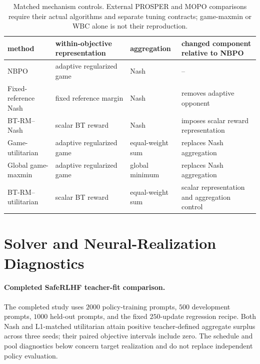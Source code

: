 \documentclass{article}
\theoremstyle{remark}
\theoremstyle{plain}
\newcommand{\NBPO}{\textsc{NBPO}}
\begin{document}
\begin{table}[t]
\centering\scriptsize
\setlength{\tabcolsep}{2.8pt}
\caption{Matched mechanism controls. External PROSPER and MOPO comparisons require their actual algorithms and separate tuning contracts; game-maxmin or WBC alone is not their reproduction.}
\label{tab:baseline-contract}
\begin{tabular}{llll}
\toprule
method & within-objective representation & aggregation & changed component relative to \NBPO{}\\
\midrule
\NBPO{} & adaptive regularized game & Nash & --\\
Fixed-reference Nash & fixed reference margin & Nash & removes adaptive opponent\\
BT-RM--Nash & scalar BT reward & Nash & imposes scalar reward representation\\
Game-utilitarian & adaptive regularized game & equal-weight sum & replaces Nash aggregation\\
Global game-maxmin & adaptive regularized game & global minimum & replaces Nash aggregation\\
BT-RM--utilitarian & scalar BT reward & equal-weight sum & scalar representation and aggregation control\\
\bottomrule
\end{tabular}
\end{table}

\section{Solver and Neural-Realization Diagnostics}
\label{app:solver-neural}

\paragraph{Completed SafeRLHF teacher-fit comparison.}
The completed study uses $2000$ policy-training prompts, $500$ development prompts, $1000$ held-out prompts, and the fixed $250$-update regression recipe. Both Nash and L1-matched utilitarian attain positive teacher-defined aggregate surplus across three seeds; their paired objective intervals include zero. The schedule and pool diagnostics below concern target realization and do not replace independent policy evaluation.
\end{document}
